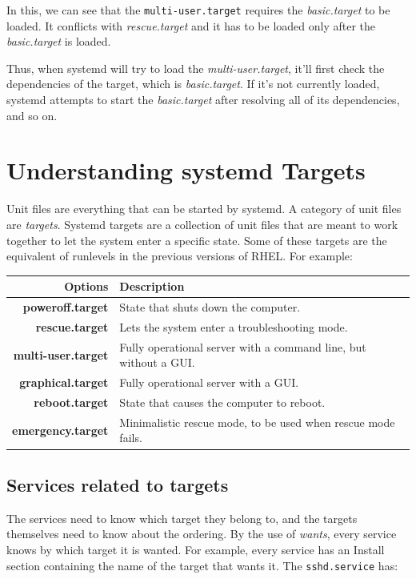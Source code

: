 \noindent
In this, we can see that the \verb|multi-user.target| requires the \textit{basic.target} to be loaded. It conflicts with \textit{rescue.target} and it has to be loaded only after the \textit{basic.target} is loaded. 

Thus, when systemd will try to load the \textit{multi-user.target}, it'll first check the dependencies of the target, which is \textit{basic.target}. If it's not currently loaded, systemd attempts to start the \textit{basic.target} after resolving all of its dependencies, and so on. 

\section{Understanding systemd Targets}
Unit files are everything that can be started by systemd. A category of unit files are \textit{targets}. Systemd targets are a collection of unit files that are meant to work together to let the system enter a specific state. Some of these targets are the equivalent of runlevels in the previous versions of RHEL. For example:

\noindent
\begin{tabular}{rM{0.73}}
	\toprule
	\textbf{Options} &\textbf{Description} \\
	\midrule
	\textbf{poweroff.target}	&State that shuts down the computer. \\
	\textbf{rescue.target}	&Lets the system enter a troubleshooting mode. \\
	\textbf{multi-user.target}	&Fully operational server with a command line, but without a GUI. \\
	\textbf{graphical.target}	&Fully operational server with a GUI.\\
	\textbf{reboot.target}	&State that causes the computer to reboot. \\
	\textbf{emergency.target}	&Minimalistic rescue mode, to be used when rescue mode fails. \\
	\bottomrule
\end{tabular}

\subsection{Services related to targets}
The services need to know which target they belong to, and the targets themselves need to know about the ordering. By the use of \textit{wants}, every service knows by which target it is wanted. For example, every service has an Install section containing the name of the target that wants it. The \verb|sshd.service| has:

